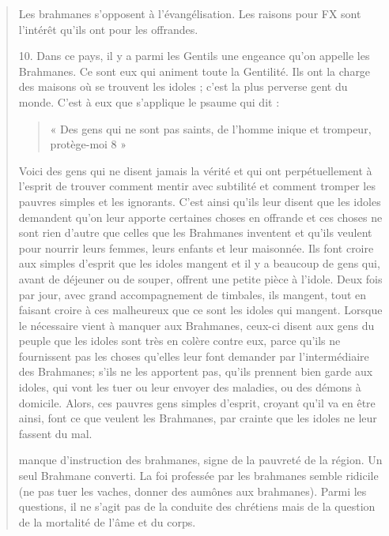 \begin{quote}
\begin{Synthesis}
Les brahmanes s'opposent à l'évangélisation. Les raisons pour FX sont l'intérêt qu'ils ont pour les offrandes. 
\end{Synthesis}

10. Dans ce pays, il y a parmi les Gentils une engeance qu'on
appelle les Brahmanes. Ce sont eux qui animent toute la Gentilité.
Ils ont la charge des maisons où se trouvent les idoles ; c'est la plus
perverse gent du monde. C'est à eux que s'applique le psaume qui
dit : \begin{quote}
    « Des gens qui ne sont pas saints, de l'homme inique et trompeur,
protège-moi 8 » 
\end{quote}Voici des gens qui ne disent jamais la vérité
et qui ont perpétuellement à l'esprit de trouver comment mentir
avec subtilité et comment tromper les pauvres simples et les ignorants.
C'est ainsi qu'ils leur disent que les idoles demandent qu'on
leur apporte certaines choses en offrande et ces choses ne sont rien
d'autre que celles que les Brahmanes inventent et qu'ils veulent
pour nourrir leurs femmes, leurs enfants et leur maisonnée. Ils font
croire aux simples d'esprit que les idoles mangent et il y a beaucoup
de gens qui, avant de déjeuner ou de souper, offrent une
petite pièce à l'idole. Deux fois par jour, avec grand accompagnement
de timbales, ils mangent, tout en faisant croire à ces malheureux
que ce sont les idoles qui mangent. Lorsque le nécessaire vient
à manquer aux Brahmanes, ceux-ci disent aux gens du peuple que
les idoles sont très en colère contre eux, parce qu'ils ne fournissent
pas les choses qu'elles leur font demander par l'intermédiaire
  des Brahmanes; s'ils ne les apportent pas, qu'ils prennent bien
garde aux idoles, qui vont les tuer ou leur envoyer des maladies,
ou des démons à domicile. Alors, ces pauvres gens simples d'esprit,
croyant qu'il va en être ainsi, font ce que veulent les Brahmanes,
par crainte que les idoles ne leur fassent du mal.


\begin{Synthesis}
manque d'instruction des brahmanes, signe de la pauvreté de la région. Un seul Brahmane converti.
La foi professée par les brahmanes semble ridicile (ne pas tuer les vaches, donner des aumônes aux brahmanes). 
Parmi les questions, il ne s'agit pas de la conduite des chrétiens mais de la question de la mortalité de l'âme et du corps. 
\end{Synthesis}


\end{quote}
